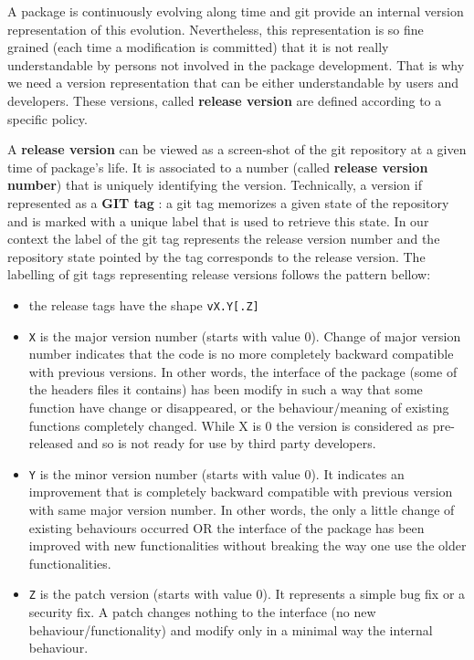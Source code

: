 \documentclass[12pt,a4paper]{article}
\begin{document}
A package is continuously evolving along time and git provide an internal version representation of this evolution. Nevertheless, this representation is so fine grained (each time a modification is committed) that it is not really understandable by persons not involved in the package development. That is why we need a version representation that can be either understandable by users and developers. These versions, called \textbf{release version} are defined according to a specific policy.

A \textbf{release version} can be viewed as a screen-shot of the git repository at a given time of package's life. It is associated to a number (called \textbf{release version number}) that is uniquely identifying the version. Technically, a version if represented as a \textbf{GIT tag} : a git tag memorizes a given state of the repository and is marked with a unique label that is used to retrieve this state. In our context the label of the git tag represents the release version number and the repository state pointed by the tag corresponds to the release version. The labelling of git tags representing release versions follows the pattern bellow:
\begin{itemize}
\item the release tags have the shape \texttt{vX.Y[.Z]}
\item \texttt{X} is the major version number (starts with value 0). Change of major version number indicates that the code is no more completely backward compatible with previous versions. In other words, the interface of the package (some of the headers files it contains) has been modify in such a way that some function have change or disappeared, or the behaviour/meaning of existing functions completely changed. While X is 0 the version is considered as pre-released and so is not ready for use by third party developers.
\item \texttt{Y} is the minor version number (starts with value 0). It indicates an improvement that is completely backward compatible with previous version with same major version number. In other words, the only a little change of existing behaviours occurred OR the interface of the package has been improved with new functionalities without breaking the way one use the older functionalities.
\item \texttt{Z} is the patch version (starts with value 0). It represents a simple bug fix or a security fix. A patch changes nothing to the interface (no new behaviour/functionality) and modify only in a minimal way the internal behaviour.
\end{itemize}
\end{document}
